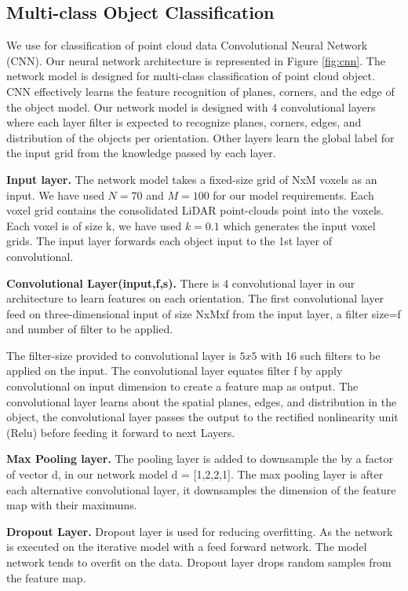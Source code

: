 \subsection{Multi-class Object Classification} 
We use for classification of point cloud data Convolutional Neural Network (CNN).
Our neural network architecture is represented in Figure \ref{fig:cnn}.
The network model is designed for multi-class classification of point cloud object.
CNN effectively learns the feature recognition of planes, corners, and the edge of the object model.
Our network model is designed with 4 convolutional layers where each layer filter is expected to
recognize planes, corners, edges, and distribution of the objects per orientation.
Other layers learn the global label for the input grid from the knowledge passed by each layer.

\textbf{Input layer.}
The network model takes a fixed-size grid of NxM voxels as an input. We have 
used $N=70$ and $M=100$ for our model requirements. Each voxel grid contains 
the consolidated LiDAR point-clouds point into the voxels. Each voxel is of size k, we 
have used $k=0.1$ which generates the input voxel grids. The input layer forwards each object input to the 1st layer
of convolutional.


\textbf{Convolutional Layer(input,f,s).}
There is 4 convolutional layer in our architecture to learn features on each orientation.
The first convolutional layer feed on three-dimensional input of size NxMxf from the input layer, a filter size=f and number of filter to be applied.

The filter-size provided to convolutional layer is $5x5$ with 16 such filters to be applied on the input.
The convolutional layer equates filter f by apply convolutional on input dimension to create a feature map as output.
The convolutional layer learns about the spatial planes, edges, and distribution in the object, 
the convolutional layer passes the output to the rectified nonlinearity unit (Relu) before feeding
it forward to next Layers.

\textbf{Max Pooling layer.} 
The pooling layer is added to downsample the by a factor of vector d, in
our network model d = [1,2,2,1]. The max pooling layer is after each alternative convolutional
layer, it downsamples the dimension of the feature map with their maximums.

\textbf{Dropout Layer.}
Dropout layer is used for reducing overfitting. As the network is executed on the iterative model with a feed forward network.
The model network tends to overfit on the data. Dropout layer drops random samples from the feature
map.

